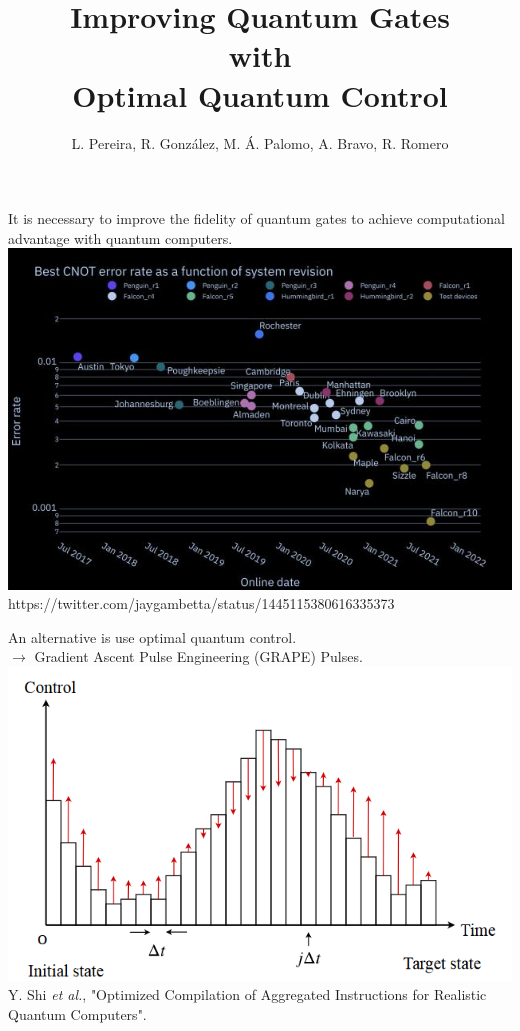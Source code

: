 \documentclass[12pt,aspectratio=169]{beamer}
\title{ Improving Quantum Gates\\ with\\ Optimal Quantum Control}
\author{\large L. Pereira, R. González, M. Á. Palomo, A. Bravo, R. Romero}
\date{}
\begin{document}
	
	\begin{frame}
		\titlepage
	\end{frame}

	\begin{frame}
		\centering
		It is necessary to improve the fidelity of quantum gates to achieve computational advantage with quantum computers. \\
		\vspace{.5cm}
		\includegraphics[scale=0.4]{cnot_ibm.jpg}\\
		{\scriptsize  https://twitter.com/jaygambetta/status/1445115380616335373 }
	\end{frame}

	\begin{frame}
		\centering
		An alternative is use optimal quantum control.\\
		\vspace{.5cm}
		$\rightarrow$ Gradient Ascent Pulse Engineering (GRAPE) Pulses.\\
		\vspace{.5cm}
		\includegraphics[scale=0.6]{grape}\\

		{\scriptsize  
		Y. Shi \emph{et al.}, "Optimized Compilation of Aggregated Instructions for Realistic Quantum Computers".}
		
	\end{frame}
\end{document}

